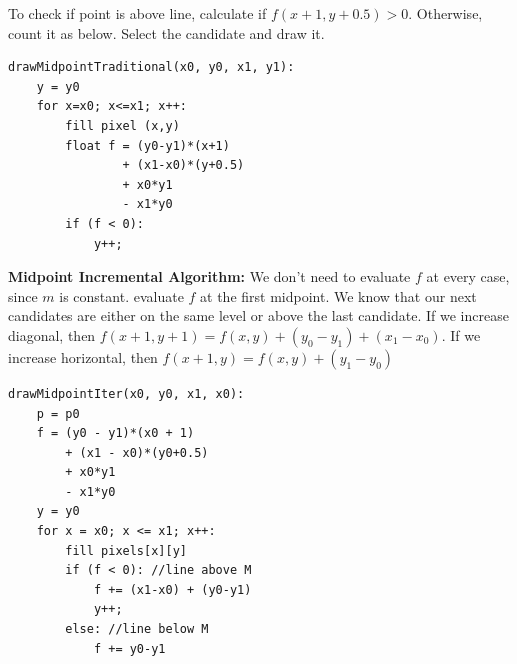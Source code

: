 \documentclass[letterpaper, 8pt]{extarticle}
\begin{document}
\begin{multicols*}{4}
To check if point is above line, calculate if $f(x+1, y+0.5) > 0$. Otherwise, count it as below. Select the candidate and draw it.

\begin{lstlisting} 
drawMidpointTraditional(x0, y0, x1, y1):
    y = y0
    for x=x0; x<=x1; x++:
        fill pixel (x,y)
        float f = (y0-y1)*(x+1) 
                + (x1-x0)*(y+0.5) 
                + x0*y1 
                - x1*y0
        if (f < 0): 
            y++;
\end{lstlisting}


\textbf{Midpoint Incremental Algorithm:} We don't need to evaluate $f$ at every case, since $m$ is constant.
evaluate $f$ at the first midpoint. We know that our next candidates are either on the same level or above the last candidate.
If we increase diagonal, then $f(x+1, y+1) = f(x,y) + (y_0 - y_1) + (x_1 - x_0)$. If we increase horizontal, then $f(x+1, y) = f(x, y) + (y_1 - y_0)$

\begin{lstlisting}
drawMidpointIter(x0, y0, x1, x0):
    p = p0
    f = (y0 - y1)*(x0 + 1) 
        + (x1 - x0)*(y0+0.5) 
        + x0*y1
        - x1*y0
    y = y0
    for x = x0; x <= x1; x++:
        fill pixels[x][y]
        if (f < 0): //line above M
            f += (x1-x0) + (y0-y1) 
            y++;
        else: //line below M
            f += y0-y1
\end{lstlisting}






\end{multicols*}
\end{document}
